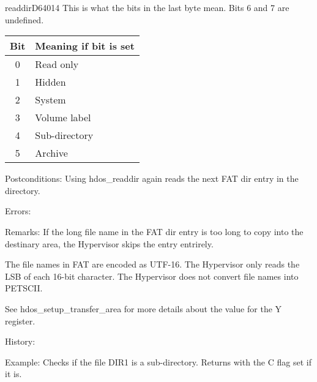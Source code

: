 \begin{hyppotrap}{readdir}{D640}{14}
  This is what the bits in the last byte mean. Bits 6 and 7 are undefined.
  {\setlength{\tabcolsep}{2mm}
  \begin{tabular}{|c|l|}
  \hline
  \textbf{Bit} & \textbf{Meaning if bit is set} \\
  \hline
  0 & Read only         \\
  1 & Hidden            \\
  2 & System            \\
  3 & Volume label      \\
  4 & Sub-directory     \\
  5 & Archive           \\
  \hline
  \end{tabular}
  }
\item [Postconditions:]
  Using hdos\_readdir again reads the next FAT dir entry in the directory.
\item [Errors:]
\item [Remarks:]
  If the long file name in the FAT dir entry is too long to copy into the
  destinary area, the Hypervisor skips the entry entrirely.

  The file names in FAT are encoded as UTF-16. The Hypervisor only reads the LSB
  of each 16-bit character. The Hypervisor does not convert file names into
  PETSCII.

  See hdos\_setup\_transfer\_area for more details about the value for the Y
  register.
\item [History:]
\item [Example:]
  Checks if the file DIR1 is a sub-directory. Returns with the C flag set if it
  is.

  \TODO
\end{hyppotrap}



